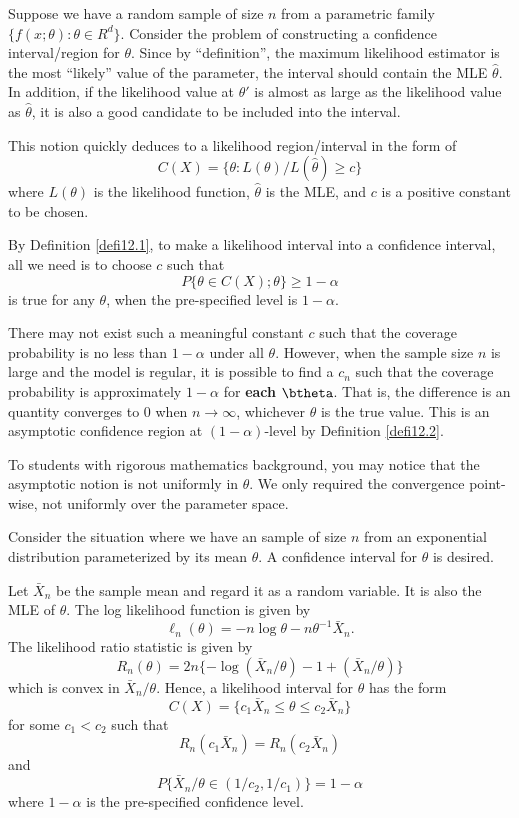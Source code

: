Suppose we have a random sample of size $n$ from a parametric
family $\{ f(x; \theta): \theta \in R^d\}$. Consider the problem of constructing
a confidence interval/region for $\theta$.
Since by ``definition'', the maximum likelihood estimator is the
most ``likely'' value of the parameter, the interval should contain
the MLE $\hat \theta$. In addition, if the likelihood value at $\theta'$ is
almost as large as the likelihood value as $\hat \theta$, it is also a good
candidate to be included into the interval.

This notion quickly deduces to a likelihood region/interval in the form of
\[
C(X) = \{ \theta:  L(\theta)/L(\hat \theta) \geq c \}
\]
where $L(\theta)$ is the likelihood function,
$\hat \theta$ is the MLE, and $c$ is a positive constant to be chosen.

By Definition \ref{defi12.1},
to make a likelihood interval into a confidence interval, all we need is
to choose $c$ such that
\[
P \{ \theta \in C(X); \theta\} \geq 1 - \alpha
\]
is true for any $\theta$, when the pre-specified level is $1 - \alpha$.

There may not exist such a meaningful constant $c$ 
such that the coverage probability is no less than $1-\alpha$ under all $\theta$.
However, when the sample size $n$ is large and the model is regular,
it is possible to find a $c_n$ such that the coverage probability
is approximately $1- \alpha$ for {\bf each} $\btheta$. That is, the difference is an quantity
converges to 0 when $n\to \infty$, whichever $\theta$ is the true value.
This is an asymptotic confidence region at $(1-\alpha)$-level
by Definition \ref{defi12.2}.

To students with rigorous mathematics background, you may notice
that the asymptotic notion is not uniformly in $\theta$. We only required
the convergence point-wise, not uniformly over the parameter space.

\begin{example}
Consider the situation where we have an \iid sample
of size $n$ from an exponential
distribution parameterized by its mean $\theta$. A confidence interval
for $\theta$ is desired.

Let $\bar X_n$ be the sample mean and regard it as a random variable.
It is also the MLE of $\theta$.
The log likelihood function is given by
\[
\ell_n(\theta) = - n \log \theta - n \theta^{-1} \bar X_n.
\]
The likelihood ratio statistic is given by
\[
R_n(\theta) = 2 n \{ -\log (\bar X_n/\theta) - 1 + (\bar X_n/\theta)\}
\]
which is convex in $\bar X_n/\theta$.
Hence, a likelihood interval for $\theta$ has the form
\[
C(X) = \{   c_1 \bar X_n \leq \theta \leq c_2 \bar X_n \}
\]
for some $c_1 < c_2$ such that
\[
R_n(c_1\bar X_n)  = R_n(c_2\bar X_n)  
\]
and 
\[
P\{  \bar X_n/\theta \in (1/c_2, 1/c_1) \} = 1- \alpha
\]
where $1-\alpha$ is the pre-specified confidence level.
\end{example}

